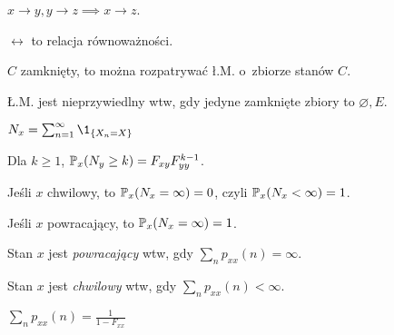 	\begin{remark}
		$x \to y, y \to z \implies x \to z$.
	\end{remark}
	
	\begin{remark}
		$\leftrightarrow$ to relacja równoważności.
	\end{remark}
	
	\begin{remark}
		$C$ zamknięty, to można rozpatrywać ł.M. o~zbiorze stanów $C$.
	\end{remark}
	
	\begin{remark}
		Ł.M. jest nieprzywiedlny wtw, gdy jedyne zamknięte zbiory 
		to $\varnothing, E$.
	\end{remark}
	
	\begin{definition}
		$N_x = \sum_{n=1}^\infty \1_{\{ X_n = X \}}$
	\end{definition}
	
	\begin{fact}
		Dla $k \geq 1$, $\P_x(N_y \geq k) = F_{xy} F_{yy}^{k-1}$.
	\end{fact}
	
	\begin{corollary}
		Jeśli $x$ chwilowy, to $\P_x(N_x = \infty) = 0$, 
		czyli $\P_x(N_x < \infty) = 1$.
	\end{corollary}
	
	\begin{corollary}
		Jeśli $x$ powracający, to $\P_x(N_x = \infty) = 1$.
	\end{corollary}
	
	\begin{theorem}
		Stan $x$ jest \emph{powracający} 
		wtw, gdy ${\sum_n p_{xx}(n) = \infty}$.
		
		Stan $x$ jest \emph{chwilowy}
		wtw, gdy $\sum_n p_{xx}(n) < \infty$.
	\end{theorem}
	
	\begin{fact}
		$\displaystyle \sum_n p_{xx}(n) = \frac1{1-F_{xx}}$
	\end{fact}






















 
 
